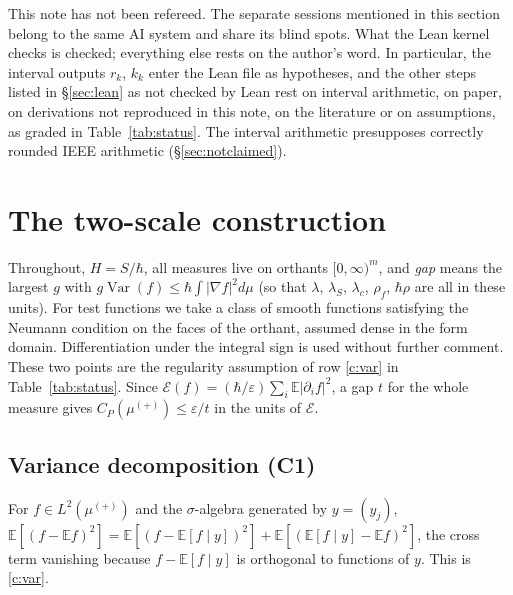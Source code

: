 \documentclass[11pt,a4paper]{article}
\theoremstyle{definition}
\theoremstyle{remark}
\newcommand{\hr}{\hbar\rho}
\newcommand{\E}{\mathbb{E}}
\DeclareMathOperator{\Var}{Var}
\begin{document}
This note has not been refereed. The separate sessions mentioned in this section belong to the same AI system and share its blind spots. What the Lean kernel checks is checked; everything else rests on the author's word. In particular, the interval outputs $r_k$, $k_k$ enter the Lean file as hypotheses, and the other steps listed in \S\ref{sec:lean} as not checked by Lean rest on interval arithmetic, on paper, on derivations not reproduced in this note, on the literature or on assumptions, as graded in Table~\ref{tab:status}. The interval arithmetic presupposes correctly rounded IEEE arithmetic (\S\ref{sec:notclaimed}).

\appendix
\section{The two-scale construction}\label{app:construction}

Throughout, $H=S/\hbar$, all measures live on orthants $[0,\infty)^m$, and \emph{gap} means the largest $g$ with $g\Var(f)\le\hbar\int|\nabla f|^2d\mu$ (so that $\lambda$, $\lambda_S$, $\lambda_c$, $\rho_f$, $\hr$ are all in these units). For test functions we take a class of smooth functions satisfying the Neumann condition on the faces of the orthant, assumed dense in the form domain. Differentiation under the integral sign is used without further comment. These two points are the regularity assumption of row \ref{c:var} in Table~\ref{tab:status}. Since $\mathcal E(f)=(\hbar/\varepsilon)\sum_i\E|\partial_if|^2$, a gap $t$ for the whole measure gives $C_P(\mu^{(+)})\le\varepsilon/t$ in the units of $\mathcal E$.

\subsection{Variance decomposition (C1)}\label{app:var}
For $f\in L^2(\mu^{(+)})$ and the $\sigma$-algebra generated by $y=(y_j)$, $\E[(f-\E f)^2]=\E[(f-\E[f\mid y])^2]+\E[(\E[f\mid y]-\E f)^2]$, the cross term vanishing because $f-\E[f\mid y]$ is orthogonal to functions of $y$. This is \ref{c:var}.
\end{document}
